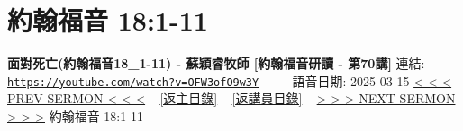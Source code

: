 \documentclass{book}
\begin{document}
\section{約翰福音 18:1-11}
\label{sec:OFW3ofO9w3Y}
\textbf{面對死亡(約翰福音18\_1-11) - 蘇穎睿牧師 [約翰福音研讀 - 第70講]}
\newline
\newline
連結: \href{https://youtube.com/watch?v=OFW3ofO9w3Y}{\texttt{https://youtube.com/watch?v=OFW3ofO9w3Y}} ~~~~ 語音日期: 2025-03-15
\newline
\newline
\hyperref[sec:cPwA4cZWWYs]{< < < PREV SERMON < < <}
~
\hyperlink{toc}{[返主目錄]}
~
\hyperref[ch:preacher10]{[返講員目錄]}
~
\hyperref[sec:Soyt_RP__Tk]{> > > NEXT SERMON > > >}
\newline
\newline
約翰福音 18:1-11
\newline
\end{document}
